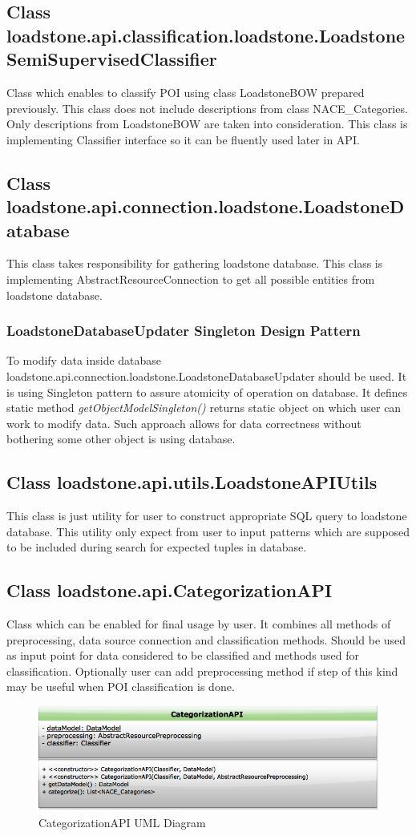 \subsection{Class \newline loadstone.api.classification.loadstone.\newline LoadstoneSemiSupervisedClassifier}
Class which enables to classify POI using class LoadstoneBOW prepared previously. This class does not include descriptions from class NACE\_Categories. Only descriptions from LoadstoneBOW are taken into consideration. This class is implementing Classifier interface so it can be fluently used later in API.

\subsection{Class \newline loadstone.api.connection.loadstone.LoadstoneDatabase}
This class takes responsibility for gathering loadstone database. This class is implementing AbstractResourceConnection to get all possible entities from loadstone database. 
 
\subsubsection{LoadstoneDatabaseUpdater Singleton Design Pattern}
To modify data inside database loadstone.api.connection.loadstone.LoadstoneDatabaseUpdater should be used. It is using Singleton pattern to assure atomicity of operation on database. It defines static method \textit{getObjectModelSingleton()} returns static object on which user can work to modify data. Such approach allows for data correctness without bothering some other object is using database.  

\subsection{Class loadstone.api.utils.LoadstoneAPIUtils}
This class is just utility for user to construct appropriate SQL query to loadstone database. This utility only expect from user to input patterns which are supposed to be included during search for expected tuples in database. 

\subsection{Class loadstone.api.CategorizationAPI}
Class which can be enabled for final usage by user. It combines all methods of preprocessing, data source connection and classification methods. Should be used as input point for data considered to be classified and methods used for classification. Optionally user can add preprocessing method if step of this kind may be useful when POI classification is done.

\begin{figure}[h]
	\centering
	\includegraphics[scale=0.5]{CategorizationAPI.png}
	\caption{CategorizationAPI UML Diagram}
	\label{fig:@=CategorizationAPI}
\end{figure}